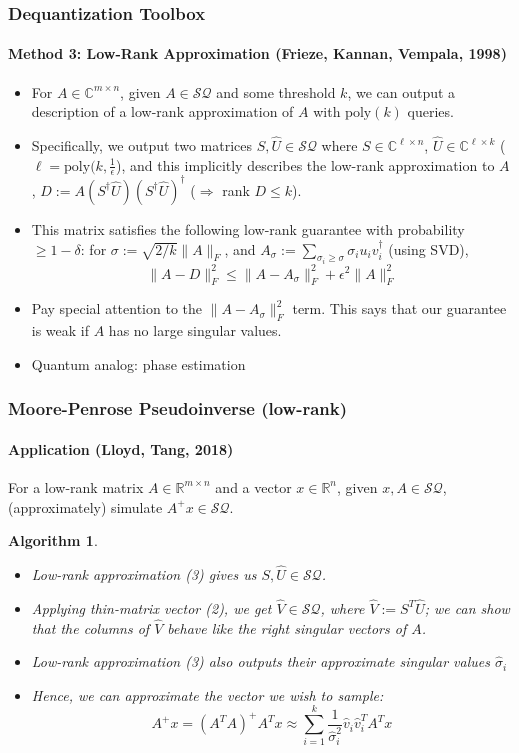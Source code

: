 \documentclass{beamer}
\newcommand\0{\mathbf{0}}
\newcommand\CC{\mathbb{C}}
\newcommand\RR{\mathbb{R}}
\newcommand\<{\langle}
\renewcommand\>{\rangle}
\renewcommand\implies{\Rightarrow}
\newtheorem{algorithm}{Algorithm}[theorem]
\begin{document}
\begin{frame}
\frametitle{Dequantization Toolbox}
\framesubtitle{Method 3: Low-Rank Approximation (Frieze, Kannan, Vempala, 1998)}
\begin{itemize}
\item For $A \in \CC^{m\times n}$, given $A \in \mathcal{SQ}$ and some threshold $k$, we can output a description of a low-rank approximation of $A$ with $\text{poly}(k)$ queries.
\item Specifically, we output two matrices $S,\hat{U}\in \mathcal{SQ}$ where $S \in \CC^{\ell \times n}$, $\hat{U} \in \CC^{\ell \times k}$ ($\ell = \text{poly}(k,\frac{1}{\epsilon}$), and this implicitly describes the low-rank approximation to $A$, $D := A(S^\dagger\hat{U})(S^\dagger\hat{U})^\dag$ ($\implies$ rank $D \leq k$).

\item This matrix satisfies the following low-rank guarantee with probability $\geq 1-\delta$: for $\sigma := \sqrt{2/k}\|A\|_F$, and $A_{\sigma} := \sum_{\sigma_i \geq \sigma} \sigma_iu_iv_i^\dag$ (using SVD), 
$$\|A - D\|_F^2 \leq \|A - A_\sigma\|_F^2 + \epsilon^2\|A\|_F^2$$
\item Pay special attention to the $\|A - A_\sigma\|_F^2$ term. This says that our guarantee is weak if $A$ has no large singular values. 
\item Quantum analog: phase estimation
\end{itemize}
\end{frame}

\begin{frame}
\frametitle{Moore-Penrose Pseudoinverse (low-rank)} 	
\framesubtitle{Application (Lloyd, Tang, 2018)}

\begin{problem} For a low-rank matrix $A \in \RR^{m\times n}$
  and a vector $x \in \RR^n$, given $x, A \in \mathcal{SQ}$, (approximately) simulate $A^+x \in \mathcal{SQ}$.
\end{problem}
\begin{algorithm}   	
\begin{itemize}
\item Low-rank approximation (3) gives us $S,\hat{U} \in \mathcal{SQ}$.

\item Applying thin-matrix vector (2), we get $\hat{V} \in \mathcal{SQ}$, where $\hat{V} := S^T\hat{U}$; we can show that the columns of $\hat{V}$ behave like the right singular vectors of $A$. 

\item Low-rank approximation (3) also outputs their approximate singular values $\hat{\sigma}_i$
 
\item Hence, we can approximate the vector we wish to sample:
$$A^+x = (A^TA)^+A^Tx \approx \sum_{i=1}^k \frac{1}{\hat{\sigma}_i^2}\hat{v}_i\hat{v}_i^T A^Tx$$
\end{itemize}
\end{algorithm}
\end{frame}
\end{document}
